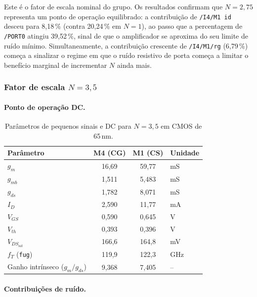 Este é o fator de escala nominal do grupo. Os resultados confirmam que $N=2{,}75$ representa um
ponto de operação equilibrado: a contribuição de \texttt{/I4/M1 id} desceu para 8{,}18\,\% (contra
20{,}24\,\% em $N=1$), ao passo que a percentagem de \texttt{/PORT0} atingiu 39{,}52\,\%, sinal de
que o amplificador se aproxima do seu limite de ruído mínimo. Simultaneamente, a contribuição
crescente de \texttt{/I4/M1/rg} (6{,}79\,\%) começa a sinalizar o regime em que o ruído resistivo
de porta começa a limitar o benefício marginal de incrementar $N$ ainda mais.

\subsubsection{Fator de escala \texorpdfstring{$N = 3{,}5$}{N=3.5}}

\paragraph{Ponto de operação DC.}

\begin{table}[H]
\centering
\caption{Parâmetros de pequenos sinais e DC para $N=3{,}5$ em CMOS de 65\,nm.}
\label{tab:op65_N35}
\begin{tabular}{lccl}
\hline
\textbf{Parâmetro} & \textbf{M4 (CG)} & \textbf{M1 (CS)} & \textbf{Unidade} \\
\hline
$g_m$                           & 16{,}69 & 59{,}77 & mS \\
$g_{mb}$                        & 1{,}511 & 5{,}483 & mS \\
$g_{ds}$                        & 1{,}782 & 8{,}071 & mS \\
$I_D$                           & 2{,}590 & 11{,}77 & mA \\
$V_{GS}$                        & 0{,}590 & 0{,}645 & V  \\
$V_{th}$                        & 0{,}393 & 0{,}396 & V  \\
$V_{DS_{\text{sat}}}$           & 166{,}6 & 164{,}8 & mV \\
$f_T$ (\texttt{fug})            & 119{,}9 & 122{,}3 & GHz \\
Ganho intrínseco ($g_m/g_{ds}$) & 9{,}368 & 7{,}405 & --  \\
\hline
\end{tabular}
\end{table}

\paragraph{Contribuições de ruído.}

